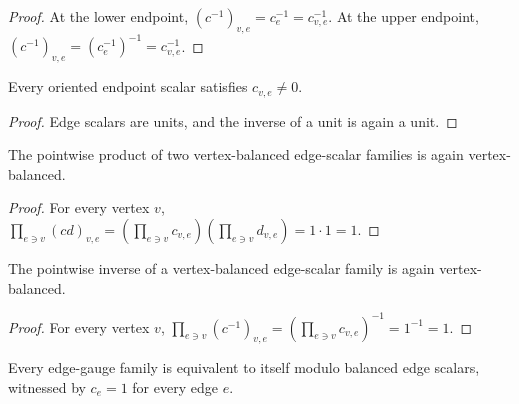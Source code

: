 \begin{proof}\leanok
    At the lower endpoint, $(c^{-1})_{v,e}=c_e^{-1}=c_{v,e}^{-1}$.
    At the upper endpoint,
    $(c^{-1})_{v,e}=(c_e^{-1})^{-1}=c_{v,e}^{-1}$.
\end{proof}

\begin{theorem}%
    \label{thm:edgeScalarAt_ne_zero}
    \leanok
    Every oriented endpoint scalar satisfies $c_{v,e}\ne 0$.
\end{theorem}

\begin{proof}\leanok
    Edge scalars are units, and the inverse of a unit is again a unit.
\end{proof}

\begin{theorem}%
    \label{thm:IsVertexBalanced_mul}
    \leanok
    The pointwise product of two vertex-balanced edge-scalar families is again
    vertex-balanced.
\end{theorem}

\begin{proof}\leanok
    For every vertex $v$,
    $\prod_{e\ni v}(cd)_{v,e}=
        (\prod_{e\ni v}c_{v,e})(\prod_{e\ni v}d_{v,e})=1\cdot 1=1$.
\end{proof}

\begin{theorem}%
    \label{thm:IsVertexBalanced_inv}
    \leanok
    The pointwise inverse of a vertex-balanced edge-scalar family is again
    vertex-balanced.
\end{theorem}

\begin{proof}\leanok
    For every vertex $v$,
    $\prod_{e\ni v}(c^{-1})_{v,e}=
        (\prod_{e\ni v}c_{v,e})^{-1}=1^{-1}=1$.
\end{proof}

\begin{theorem}%
    \label{thm:GaugeEquivModEdgeScalars_refl}
    \leanok
    Every edge-gauge family is equivalent to itself modulo balanced edge
    scalars, witnessed by $c_e=1$ for every edge $e$.
    \begin{center}
        \TNPEPSEdgeGaugeOrientation
    \end{center}
\end{theorem}

